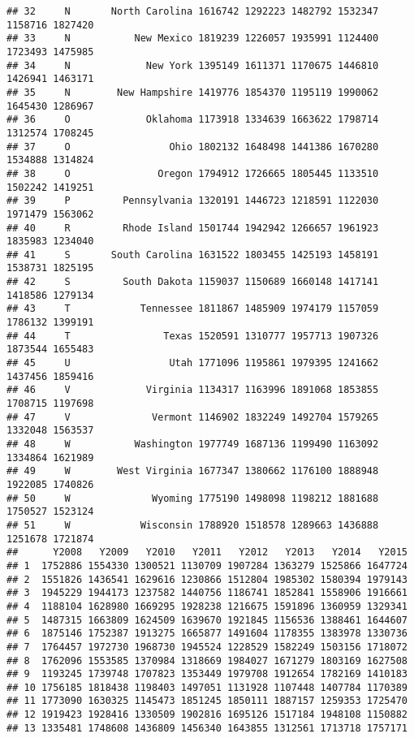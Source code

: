 \documentclass[
]{article}
\begin{document}
\begin{verbatim}
## 32     N       North Carolina 1616742 1292223 1482792 1532347 1158716 1827420
## 33     N           New Mexico 1819239 1226057 1935991 1124400 1723493 1475985
## 34     N             New York 1395149 1611371 1170675 1446810 1426941 1463171
## 35     N        New Hampshire 1419776 1854370 1195119 1990062 1645430 1286967
## 36     O             Oklahoma 1173918 1334639 1663622 1798714 1312574 1708245
## 37     O                 Ohio 1802132 1648498 1441386 1670280 1534888 1314824
## 38     O               Oregon 1794912 1726665 1805445 1133510 1502242 1419251
## 39     P         Pennsylvania 1320191 1446723 1218591 1122030 1971479 1563062
## 40     R         Rhode Island 1501744 1942942 1266657 1961923 1835983 1234040
## 41     S       South Carolina 1631522 1803455 1425193 1458191 1538731 1825195
## 42     S         South Dakota 1159037 1150689 1660148 1417141 1418586 1279134
## 43     T            Tennessee 1811867 1485909 1974179 1157059 1786132 1399191
## 44     T                Texas 1520591 1310777 1957713 1907326 1873544 1655483
## 45     U                 Utah 1771096 1195861 1979395 1241662 1437456 1859416
## 46     V             Virginia 1134317 1163996 1891068 1853855 1708715 1197698
## 47     V              Vermont 1146902 1832249 1492704 1579265 1332048 1563537
## 48     W           Washington 1977749 1687136 1199490 1163092 1334864 1621989
## 49     W        West Virginia 1677347 1380662 1176100 1888948 1922085 1740826
## 50     W              Wyoming 1775190 1498098 1198212 1881688 1750527 1523124
## 51     W            Wisconsin 1788920 1518578 1289663 1436888 1251678 1721874
##      Y2008   Y2009   Y2010   Y2011   Y2012   Y2013   Y2014   Y2015
## 1  1752886 1554330 1300521 1130709 1907284 1363279 1525866 1647724
## 2  1551826 1436541 1629616 1230866 1512804 1985302 1580394 1979143
## 3  1945229 1944173 1237582 1440756 1186741 1852841 1558906 1916661
## 4  1188104 1628980 1669295 1928238 1216675 1591896 1360959 1329341
## 5  1487315 1663809 1624509 1639670 1921845 1156536 1388461 1644607
## 6  1875146 1752387 1913275 1665877 1491604 1178355 1383978 1330736
## 7  1764457 1972730 1968730 1945524 1228529 1582249 1503156 1718072
## 8  1762096 1553585 1370984 1318669 1984027 1671279 1803169 1627508
## 9  1193245 1739748 1707823 1353449 1979708 1912654 1782169 1410183
## 10 1756185 1818438 1198403 1497051 1131928 1107448 1407784 1170389
## 11 1773090 1630325 1145473 1851245 1850111 1887157 1259353 1725470
## 12 1919423 1928416 1330509 1902816 1695126 1517184 1948108 1150882
## 13 1335481 1748608 1436809 1456340 1643855 1312561 1713718 1757171

\end{verbatim}
\end{document}
